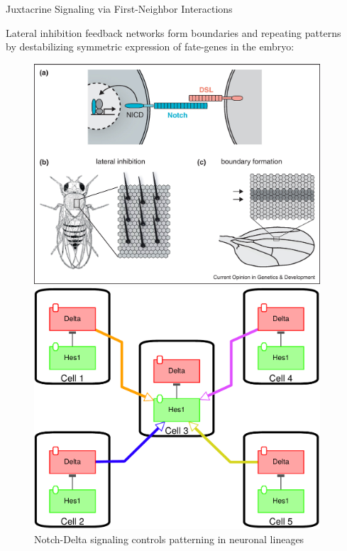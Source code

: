 \documentclass[xelatex]{beamer}
\newlength{\sepwidth}
\newlength{\colwidth}
\newcommand{\separatorcolumn}{\begin{column}{\sepwidth}\end{column}}
\begin{document}
\begin{frame}[t]
\begin{columns}[t]
\separatorcolumn

\begin{column}{\colwidth}

  \begin{block}{Juxtacrine Signaling via First-Neighbor Interactions}

    Lateral inhibition feedback networks form boundaries and repeating patterns by destabilizing symmetric expression of fate-genes in the embryo:

	\begin{figure}
		\centering
		\begin{minipage}{0.4\textwidth}
			\includegraphics[scale=1.25]{Image/fly}
			\caption{Notch-Delta signaling controls patterning in neuronal lineages \cite{shaya_notch_2011}}
		\end{minipage}
	\hspace{2.5cm}
		\begin{minipage}{0.4\textwidth}
			\includegraphics[scale=0.6]{Image/delta_LI_in}

\end{minipage}
\end{figure}
\end{block}
\end{column}
\end{columns}
\end{frame}
\end{document}
